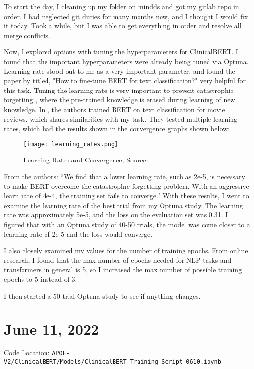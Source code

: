 \documentclass[11pt,letterpaper]{article}
\begin{document}
To start the day, I cleaning up my folder on mindds and got my gitlab repo in order. I had neglected git duties for many months now, and I thought I would fix it today. Took a while, but I was able to get everything in order and resolve all merge conflicts. 

Now, I explored options with tuning the hyperparameters for ClinicalBERT. I found that the important hyperparameters were already being tuned via Optuna. Learning rate stood out to me as a very important parameter, and found the paper by \citep{sun2019fine} titled, "How to fine-tune BERT for text classification?" very helpful for this task. Tuning the learning rate is very important to prevent catastrophic forgetting \citep{mccloskey1989catastrophic},  where the pre-trained knowledge is erased during learning of new knowledge. In \citep{sun2019fine}, the authors trained BERT on text classification for movie reviews, which shares similarities with my task. They tested multiple learning rates, which had the results shown in the convergence graphs shown below:

\begin{figure}[ht!]
\centering
\texttt{[image: learning\_rates.png]}
\caption{Learning Rates and Convergence, Source: \citep{sun2019fine}}
\end{figure}

From the authors: ``We find that a lower learning rate, such as 2e-5, is necessary to make BERT overcome the catastrophic forgetting problem. With an aggressive learn rate of 4e-4, the training set fails to converge." With these results, I went to examine the learning rate of the best trial from my Optuna study. The learning rate was approximately 5e-5, and the loss on the evaluation set was 0.31. I figured that with an Optuna study of 40-50 trials, the model was come closer to a learning rate of 2e-5 and the loss would converge. 

I also closely examined my values for the number of training epochs. From online research, I found that the max number of epochs needed for NLP tasks and transformers in general is 5, so I increased the max number of possible training epochs to 5 instead of 3. 

I then started a 50 trial Optuna study to see if anything changes.

\section{June 11, 2022}
Code Location: \texttt{APOE-V2/ClinicalBERT/Models/ClinicalBERT\_Training\_Script\_0610.ipynb}
\end{document}
